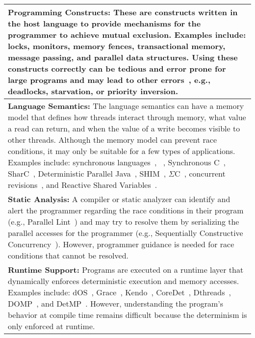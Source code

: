 \begin{table}
	\def\arraystretch{1.3}

	 {
		\begin{tabular}{| p{\textwidth} |}
			\hline
			\textbf{Programming Constructs:}
			These are constructs written in the host language to provide mechanisms for the 
			programmer to achieve mutual exclusion. Examples include: locks, monitors, memory fences,
			transactional memory, message passing, and parallel data structures. Using these 
			constructs correctly can be tedious and error prone for large programs and may lead to other 
			errors~\cite{multiprocessing_problem_threads,multiprocessing_debugging_concurrency,multiprocessing_debugging_concurrency_study}, 
			e.g., deadlocks, starvation, or priority inversion.									\\ \hline
		
			\textbf{Language Semantics:}
			The language semantics can have a memory model that defines how threads interact 
			through memory, what value a read can return, and when the value of a write becomes 
			visible to other threads. Although the memory model can prevent race conditions, it 
			may only be suitable for a few types of applications. Examples include: synchronous 
			languages~\cite{timed_synchronous_survey}, \pretc{}~\cite{pret_pretc}, Synchronous 
			C~\cite{timed_synccharts_c_proposal}, SharC~\cite{multiprocessing_sharc}, 
			Deterministic Parallel Java~\cite{multiprocessing_dpj}, SHIM~\cite{multiprocessing_shim_cell}, 
			$\Sigma$C~\cite{multiprocessing_sigmac}, concurrent revisions~\cite{BurckhardtL11}, and 
			Reactive Shared Variables~\cite{timed_reactivec_shared_variables}. 					\\ \hline
		
			\textbf{Static Analysis:}
			A compiler or static analyzer can identify and alert the programmer regarding the race 
			conditions in their program (e.g., Parallel Lint~\cite{parallel_lint}) and may try 
			to resolve them by serializing the parallel accesses for the programmer 
			(e.g., Sequentially Constructive Concurrency~\cite{timed_seq_concurrency}). However, 
			programmer guidance is needed for race conditions that cannot be resolved.			\\ \hline
		
			\textbf{Runtime Support:}
			Programs are executed on a runtime layer that dynamically enforces deterministic 
			execution and memory accesses. Examples include: dOS~\cite{multiprocessing_dos},
			Grace~\cite{multiprocessing_grace}, Kendo~\cite{multiprocessing_kendo}, 
			CoreDet~\cite{multiprocessing_coredet}, Dthreads~\cite{multiprocessing_dthreads}, 
			DOMP~\cite{multiprocessing_domp}, and DetMP~\cite{multiprocessing_detmp}. However, 
			understanding the program's behavior at compile time remains difficult because the 
			determinism is only enforced at runtime.											\\ \hline
		

\end{tabular}}
\end{table}
